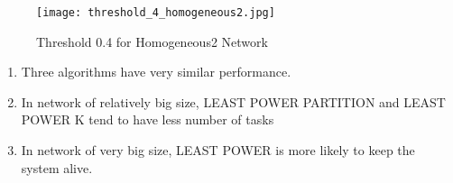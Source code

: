 \documentclass[11pt]{article}
\begin{document}
\begin{figure}[ht!]
\centering
\texttt{[image: threshold\_4\_homogeneous2.jpg]}
\caption{Threshold 0.4 for Homogeneous2 Network}
\label{fig:threshold_4_homogeneous2}
\end{figure}

\begin{enumerate}
\item Three algorithms have very similar performance.
\item In network of relatively big size, LEAST POWER PARTITION and LEAST POWER K tend to have less number of tasks
\item In network of very big size, LEAST POWER is more likely to keep the system alive.

\end{enumerate}
\end{document}
